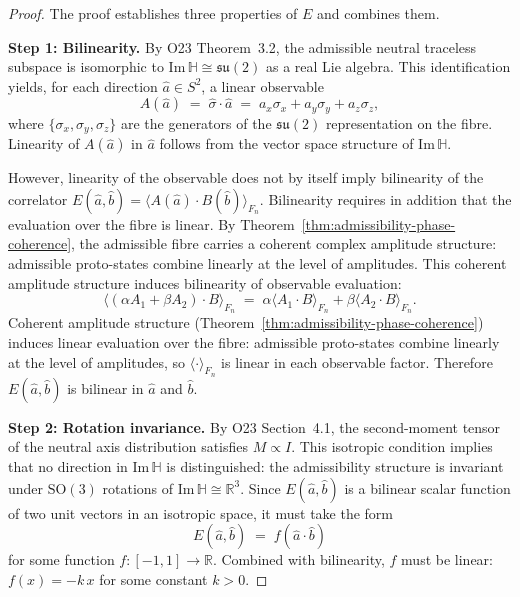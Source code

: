 \begin{proof}
  The proof establishes three properties of $E$ and combines them.

  \textbf{Step 1: Bilinearity.}
  By O23 Theorem~3.2, the admissible neutral traceless subspace is isomorphic to
  $\mathrm{Im}\,\mathbb{H} \cong \mathfrak{su}(2)$ as a real Lie algebra.
  This identification yields, for each direction $\hat{a} \in S^2$, a linear
  observable
  \begin{equation}
    A(\hat{a}) \;=\; \hat{\sigma} \cdot \hat{a}
    \;=\; a_x \sigma_x + a_y \sigma_y + a_z \sigma_z,
  \end{equation}
  where $\{\sigma_x, \sigma_y, \sigma_z\}$ are the generators of the
  $\mathfrak{su}(2)$ representation on the fibre.
  Linearity of $A(\hat{a})$ in $\hat{a}$ follows from the vector space
  structure of $\mathrm{Im}\,\mathbb{H}$.

  However, linearity of the observable does not by itself imply bilinearity
  of the correlator $E(\hat{a},\hat{b}) = \langle A(\hat{a}) \cdot B(\hat{b})
  \rangle_{F_n}$.
  Bilinearity requires in addition that the evaluation over the fibre is linear.
  By Theorem~\ref{thm:admissibility-phase-coherence}, the admissible fibre
  carries a coherent complex amplitude structure: admissible proto-states
  combine linearly at the level of amplitudes.
  This coherent amplitude structure induces bilinearity of observable evaluation:
  \begin{equation}
    \langle (\alpha A_1 + \beta A_2) \cdot B \rangle_{F_n}
    \;=\;
    \alpha \langle A_1 \cdot B \rangle_{F_n}
    + \beta \langle A_2 \cdot B \rangle_{F_n}.
  \end{equation}
  Coherent amplitude structure (Theorem~\ref{thm:admissibility-phase-coherence})
  induces linear evaluation over the fibre: admissible proto-states combine
  linearly at the level of amplitudes, so $\langle\cdot\rangle_{F_n}$
  is linear in each observable factor.
  Therefore $E(\hat{a},\hat{b})$ is bilinear in $\hat{a}$ and $\hat{b}$.

  \textbf{Step 2: Rotation invariance.}
  By O23 Section~4.1, the second-moment tensor of the neutral axis distribution
  satisfies $M \propto I$.
  This isotropic condition implies that no direction in $\mathrm{Im}\,\mathbb{H}$
  is distinguished: the admissibility structure is invariant under
  $\mathrm{SO}(3)$ rotations of $\mathrm{Im}\,\mathbb{H} \cong \mathbb{R}^3$.
  Since $E(\hat{a},\hat{b})$ is a bilinear scalar function of two unit vectors
  in an isotropic space, it must take the form
  \begin{equation}
    E(\hat{a}, \hat{b}) \;=\; f(\hat{a} \cdot \hat{b})
  \end{equation}
  for some function $f: [-1,1] \to \mathbb{R}$.
  Combined with bilinearity, $f$ must be linear: $f(x) = -k\,x$ for some
  constant $k > 0$.


\end{proof}
